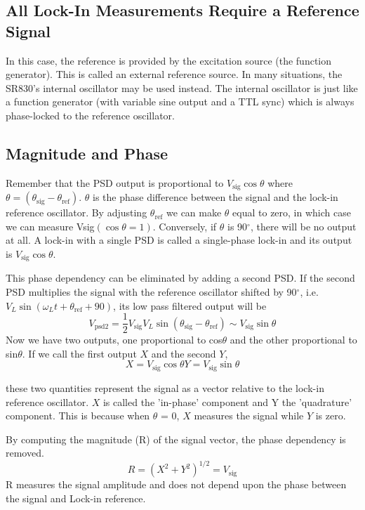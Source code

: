 \documentclass{../lab}
\begin{document}
\subsection{All Lock-In Measurements Require a Reference Signal}

In this case, the reference is provided by the excitation source (the function generator). This is called an external reference source. In many situations, the SR830's internal oscillator may be used instead. The internal oscillator is just like a function generator (with variable sine output and a TTL sync) which is always phase-locked to the reference oscillator.

\subsection{Magnitude and Phase}

Remember that the PSD output is proportional to $V_\text{sig} \cos \theta$ where $\theta = (\theta_\text{sig} - \theta_\text{ref})$. $\theta$ is the phase difference between the signal and the lock-in reference oscillator. By adjusting $\theta_\text{ref}$ we can make $\theta$ equal to zero, in which case we can measure Vsig$(\cos \theta = 1)$. Conversely, if $\theta$ is 90$^\circ$, there will be no output at all. A lock-in with a single PSD is called a single-phase lock-in and its output is $V_\text{sig} \cos \theta$.

This phase dependency can be eliminated by adding a second PSD. If the second PSD multiplies the signal with the reference oscillator shifted by 90$^\circ$, i.e. $V_L \sin(\omega_Lt + \theta_\text{ref} + 90)$, its low pass filtered output will be
\[
    V_\text{psd2} = \frac{1}{2} V_\text{sig} V_L \sin(\theta_\text{sig} - \theta_\text{ref}) \sim V_\text{sig} \sin \theta
\]
Now we have two outputs, one proportional to cos$\theta$ and the other proportional to sin$\theta$. If we call the first output $X$ and the second $Y$,
\[
    X = V_\text{sig} \cos \theta Y = V_\text{sig} \sin \theta
\]

these two quantities represent the signal as a vector relative to the lock-in reference oscillator. $X$ is called the 'in-phase' component and Y the 'quadrature' component. This is because when $\theta$ = 0, $X$ measures the signal while $Y$ is zero.

By computing the magnitude (R) of the signal vector, the phase dependency is removed.
\[
    R = (X^2 + Y^2)^{1/2} = V_\text{sig}
\]
R measures the signal amplitude and does not depend upon the phase between the signal and Lock-in reference.
\end{document}
